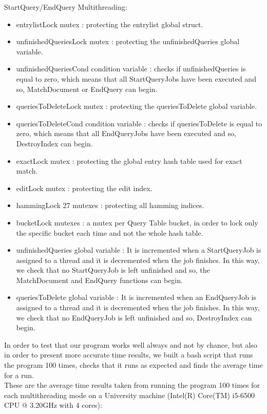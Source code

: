 \documentclass{article}
\begin{document}
StartQuery/EndQuery Multithreading:
\begin{itemize}
\item entrylistLock mutex : protecting the entrylist global struct.
\item unfinishedQueriesLock mutex : protecting the unfinishedQueries global variable.
\item unfinishedQueriesCond condition variable : checks if unfinishedQueries is equal to zero, which means that all StartQueryJobs have been executed and so, MatchDocument or EndQuery can begin.
\item queriesToDeleteLock mutex : protecting the queriesToDelete global variable.
\item queriesToDeleteCond condition variable : checks if queriesToDelete is equal to zero, which means that all EndQueryJobs have been executed and so, DestroyIndex can begin.
\item exactLock mutex : protecting the global entry hash table used for exact match.
\item editLock mutex : protecting the edit index.
\item hammingLock 27 mutexes : protecting all hamming indices.
\item bucketLock mutexes : a mutex per Query Table bucket, in order to lock only the specific bucket each time and not the whole hash table.
\item unfinishedQueries global variable : It is incremented when a StartQueryJob is assigned to a thread and it is decremented when the job finishes. In this way, we check that no StartQueryJob is left unfinished and so, the MatchDocument and EndQuery functions can begin.
\item queriesToDelete global variable : It is incremented when an EndQueryJob is assigned to a thread and it is decremented when the job finishes. In this way, we check that no EndQueryJob is left unfinished and so, DestroyIndex can begin.
\end{itemize}
In order to test that our program works well always and not by chance, but also in order to present more accurate time results, we built a bash script that runs the program 100 times, checks that it runs as expected and finds the average time for a run. \\
These are the average time results taken from running the program 100 times for each multithreading mode on a University machine (Intel(R) Core(TM) i5-6500 CPU @ 3.20GHz with 4 cores): \\ \\
\end{document}
